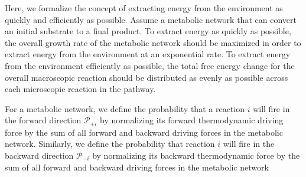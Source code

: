 Here, we formalize the concept of extracting energy from the environment as quickly and efficiently as possible. Assume a metabolic network that can convert an initial substrate to a final product. To extract energy as quickly as possible, the overall growth rate of the metabolic network should be maximized in order to extract energy from the environment at an exponential rate.   To extract energy from the environment efficiently as possible, the total free energy change for the overall macroscopic reaction should be distributed as evenly as possible across each microscopic reaction in the pathway.


For a metabolic network, we define the probability that a reaction $i$ will fire in the forward  direction ${\mathcal P_{+i}}$ by normalizing its forward thermodynamic driving force by the sum of all forward and backward driving forces in the metabolic network. Similarly, we define the probability that reaction $i$ will fire in the backward direction $\mathcal P_{-i}$ by normalizing its backward thermodynamic force by  the sum of all forward and backward driving forces in the metabolic network